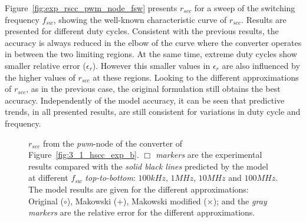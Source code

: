 Figure~\ref{fig:exp_rscc_pwm_node_fsw} presents $r_{scc}$ for a sweep of the switching frequency $f_{sw}$, showing the well-known characteristic curve of $r_{scc}$. Results are presented  for different duty cycles. Consistent with the previous results, the accuracy is always reduced in the elbow of the curve where the converter operates in between the two limiting regions. At the same time, extreme duty cycles show smaller relative error ($\epsilon_r$). However this smaller values in $\epsilon_r$ are also influenced by the higher values of $r_{scc}$ at these regions.  Looking to the different approximations of $r_{scc}$, as in the previous case, the original formulation still obtains the best accuracy. Independently of the model accuracy, it can be seen that predictive trends, in all presented results, are still consistent for variations in duty cycle and frequency.

\begin{figure}[!h]
\centering
    \begin{subfigure}{\textwidth}
        \parbox[c]{.03\linewidth}{\subcaption{}\label{fig:exp_rscc_pwm_node_100kHz}}
        \hspace{.02\linewidth}
        \parbox[c]{.95\linewidth}{
        \centering
        }
    \end{subfigure}

    \begin{subfigure}{\textwidth}
        \parbox[c]{.03\linewidth}{\subcaption{}\label{fig:exp_rscc_pwm_node_1MHz}}
        \hspace{.02\linewidth}
        \parbox[c]{.95\linewidth}{
        \centering
        }
    \end{subfigure}

    \begin{subfigure}{\textwidth}
        \parbox[c]{.03\linewidth}{\subcaption{}\label{fig:exp_rscc_pwm_node_10MHz}}
        \hspace{.02\linewidth}
        \parbox[c]{.95\linewidth}{
        \centering
        }
    \end{subfigure}

    \begin{subfigure}{\textwidth}
        \parbox[c]{.03\linewidth}{\subcaption{}\label{fig:exp_rscc_pwm_node_100MHz}}
        \hspace{.02\linewidth}
        \parbox[c]{.95\linewidth}{
        \centering
        }
    \end{subfigure}

\caption{$r_{scc}$ from the \emph{pwm}-node of the converter of Figure~\ref{fig:3_1_hscc_exp_b}. \emph{$\Box$ markers} are the experimental results compared with the \emph{solid black lines} predicted by the model at different $f_{sw}$ \emph{top-to-bottom}: $100kHz$, $1MHz$, $10MHz$ and $100MHz$. The model results are given for the different approximations: Original ($\circ$), Makowski ($+$), Makowski modified ($\times$); and the \emph{gray markers} are the relative error for the different approximations.  }
\label{fig:exp_rscc_pwm_node_dx}
\end{figure}

